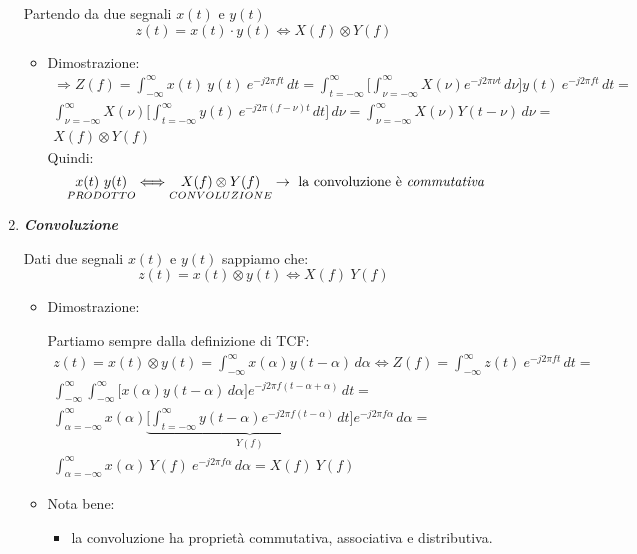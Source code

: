 \documentclass[
  paper=a4,
  ,captions=tableheading
]{scrartcl}
\providecommand{\tightlist}{%
  \setlength{\itemsep}{0pt}\setlength{\parskip}{0pt}}
\begin{document}
\begin{enumerate}
  Partendo da due segnali \(x(t)\) e \(y(t)\) \[
  z(t)=x(t)\cdot y(t) \Longleftrightarrow X(f) \otimes Y(f)
  \]

  \begin{itemize}
  \tightlist
  \item
    Dimostrazione: \begin{gather*}
    \Rightarrow Z(f) =  \int_{-\infty}^{\infty}x(t)\ y(t)\ e^{-j2\pi ft}\,dt = \int_{t=-\infty}^{\infty} \Big[ \int_{\nu = -\infty}^{\infty} X(\nu) e^{-j2\pi \nu t} \,d\nu \Big ] y(t)\ e^{-j2\pi ft}\,dt= \\ \int_{\nu=-\infty}^{\infty} X(\nu) \Big[ \int_{t = -\infty}^{\infty}  y(t)\ e^{-j2\pi (f-\nu)t}\,dt \Big ] \,d\nu =  \int_{\nu = -\infty}^{\infty} X(\nu) Y(t-\nu) \,d\nu = \\ X(f) \otimes Y(f)
    \end{gather*} Quindi: \[
    \underset{PRODOTTO}{x(t) \ y(t)} \Longleftrightarrow \underset{CONVOLUZIONE}{X(f)\otimes Y(f)} \to \text{ la convoluzione è \textit{commutativa}}
    \]
  \end{itemize}
\item
  \textbf{\emph{Convoluzione}}

  Dati due segnali \(x(t)\) e \(y(t)\) sappiamo che: \[
  z(t) = x(t) \otimes y(t) \Longleftrightarrow X(f) \ Y(f)
  \]

  \begin{itemize}
  \item
    Dimostrazione:

    Partiamo sempre dalla definizione di TCF: \begin{gather*}
    z(t) = x(t) \otimes y(t) = \int_{-\infty}^{\infty} x(\alpha) y(t-\alpha) \,d\alpha \Longleftrightarrow Z(f) = \int_{-\infty}^{\infty} z(t) \ e^{-j2\pi ft} \,dt = \\  \int_{-\infty}^{\infty} \int_{-\infty}^{\infty} \Big [ x(\alpha) y(t -\alpha) \,d\alpha  \Big] e^{-j2\pi f(t-\alpha+\alpha)} \,dt =\\
    \int_{\alpha=-\infty}^{\infty} x(\alpha) \underbrace{\Big [\int_{t=-\infty}^{\infty}y(t-\alpha)e^{-j2\pi f(t-\alpha)}\,dt \Big ]}_{Y(f)}  e^{-j2\pi f\alpha} \,d\alpha = \\ \int_{\alpha=-\infty}^{\infty} x(\alpha) \ Y(f) \ e^{-j2\pi f\alpha}\,d\alpha = X(f) \ Y(f)
    \end{gather*}
  \item
    Nota bene:

    \begin{itemize}
    \tightlist
    \item
      la convoluzione ha proprietà commutativa, associativa e
      distributiva.
    \end{itemize}
  \end{itemize}
\end{enumerate}
\end{document}
